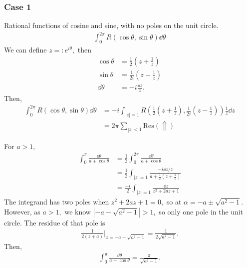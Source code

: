 \documentclass[a4paper,12pt]{article}
\begin{document}
\subsubsection{Case 1}
Rational functions of cosine and sine, with no poles on the unit circle. \begin{align}
    \int_0^{2\pi}R(\cos\theta,\sin\theta)\dd\theta
\end{align}
We can define $z=:e^{i\theta},$ then \begin{align}
    \cos\theta&=\frac{1}{2}\left(z+\frac{1}{z}\right)\\
    \sin\theta&=\frac{1}{2i}\left(z-\frac{1}{z}\right)\\
    \dd\theta &=-i\frac{\dd z}{z}.
\end{align}
Then, \begin{align}
    \int_0^{2\pi}R(\cos\theta,\sin\theta)\dd\theta&=-i\int_{|z|=1}R\left(\frac{1}{2}\left(z+\frac{1}{z}\right),\frac{1}{2i}\left(z-\frac{1}{z}\right)\right)\frac{1}{z}\dd z\\
    &=2\pi\sum_{|z|<1}\mathrm{Res}(\Uparrow)
\end{align}
\begin{example}
    For $a>1,$ \begin{align}
        \int_0^\pi\frac{\dd\theta}{a+\cos\theta}&=\frac{1}{2}\int_0^{2\pi}\frac{\dd\theta}{a+\cos\theta}\\
        &=\frac{1}{2}\int_{|z|=1}\frac{-i\dd z/z}{a+\frac{1}{2}\left(z+\frac{1}{z}\right)}\\
        &=\frac{-i}{2}\int_{|z|=1}\frac{\dd z}{z^2+2az+1}
    \end{align}
    The integrand has two poles when $z^2+2az+1=0,$ so at $\alpha=-a\pm\sqrt{a^2-1}.$ However, as $a>1,$ we know $|-a-\sqrt{a^2-1}|>1,$ so only one pole in the unit circle. The residue of that pole is \begin{align}
        \frac{1}{2(z+a)}\Big|_{z=-a+\sqrt{a^2-1}}=\frac{1}{2\sqrt{a^2-1}}.
    \end{align}
    Then, \begin{align}
        \int_{0}^\pi\frac{\dd\theta}{a+\cos\theta}=\frac{\pi}{\sqrt{a^2-1}}.
    \end{align}
\end{example}
\end{document}
